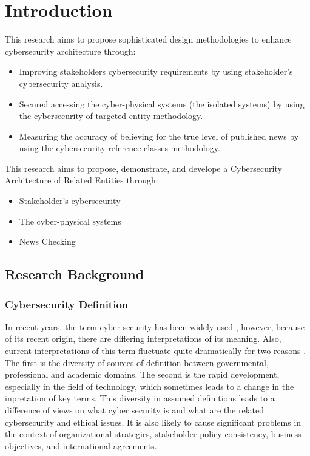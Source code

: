 \chapter{Introduction}

\if 
This research aims to propose sophisticated design methodologies to enhance cybersecurity architecture through:
\begin{itemize}
\item Improving stakeholders cybersecurity requirements by using stakeholder's cybersecurity analysis.
\item Secured accessing
the cyber-physical systems (the isolated systems) by using the cybersecurity of targeted entity methodology.
\item Measuring the accuracy of believing for the true level of published news by using the cybersecurity reference classes methodology. 
\end{itemize} \fi
\if
This research aims to propose,  demonstrate, and develope a Cybersecurity Architecture of Related Entities through:
\begin{itemize}
\item Stakeholder's cybersecurity  %
\item  The cyber-physical systems %
\item  News Checking %
\end{itemize}
\fi


\section{Research Background}
\subsection{Cybersecurity Definition}
In recent years, the term cyber security has been widely used \cite{craigen2014defining,schatz2017towards,giles2013divided}, however, because of its recent origin, there are differing interpretations of its meaning. Also, current interpretations of this term fluctuate quite dramatically for two reasons \cite{schatz2017towards}. The first is the diversity of sources of definition between governmental, professional and academic domains. The second  is the rapid development, especially in the field of technology, which sometimes leads to a change in the inpretation of key terms. This diversity in assumed definitions leads to a difference of views on what cyber security is and what are the related cybersecurity and ethical issues. It is also likely to cause significant problems in the context of organizational strategies, stakeholder policy consistency, business objectives, and international agreements. 

